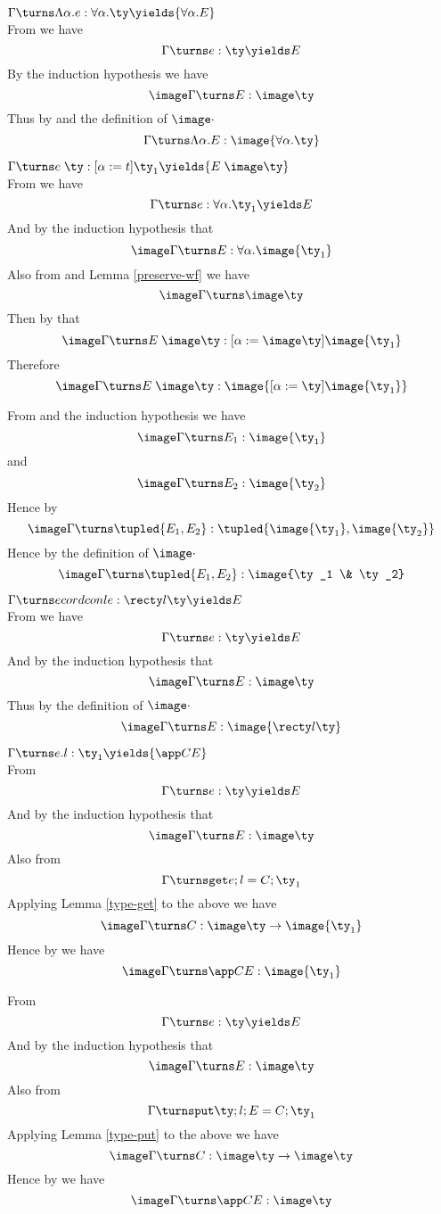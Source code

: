  $ \Gamma \turns \Lambda \alpha. e : \forall \alpha. \ty \yields {\forall \alpha. E} $ \\

From  we have
  $$ \Gamma \turns e : \ty \yields E $$
By the induction hypothesis we have
  $$ \image \Gamma \turns E : \image \ty $$
Thus by  and the definition of $ \image \cdot $
  $$ \Gamma \turns \Lambda \alpha. E : \image {\forall \alpha. \ty} $$


 $ \Gamma \turns e \; \ty  : [\alpha := t] \ty_1 \yields {E \; \image \ty} $ \\

From  we have
  $$ \Gamma \turns e : \forall \alpha. \ty_1 \yields E $$
And by the induction hypothesis that
  $$ \image \Gamma \turns E : \forall \alpha. \image {\ty_1} $$
Also from  and Lemma \ref{preserve-wf} we have
  $$ \image \Gamma \turns \image \ty $$
Then by  that
  $$ \image \Gamma \turns E \; \image \ty : [\alpha := \image \ty ] \image {\ty_1} $$
Therefore
  $$ \image \Gamma \turns E \; \image \ty : \image {[\alpha := \ty ] \image {\ty_1}} $$


From  and the induction hypothesis we have
  $$ \image \Gamma \turns E_1 : \image {\ty_1} $$
and
  $$ \image \Gamma \turns E_2 : \image {\ty_2} $$
Hence by 
  $$ \image \Gamma \turns \tupled {E_1, E_2} : \tupled {\image {\ty_1}, \image {\ty_2}} $$
Hence by the definition of $ \image \cdot $
  $$ \image \Gamma \turns \tupled {E_1, E_2} : \image {\ty_1 \& \ty_2} $$

 $ \Gamma \turns 
ecordcon l e : \recty l \ty \yields E $ \\

From  we have
  $$ \Gamma \turns e : \ty \yields E $$
And by the induction hypothesis that
  $$ \image \Gamma \turns E : \image \ty $$
Thus by the definition of $ \image \cdot $
  $$ \image \Gamma \turns E : \image {\recty l \ty} $$

 $ \Gamma \turns e.l : \ty_1 \yields {\app C E} $ \\

From 
  $$ \Gamma \turns e : \ty \yields E $$
And by the induction hypothesis that
  $$ \image \Gamma \turns E : \image \ty $$
Also from 
  $$ \Gamma \turnsget e ; l = C ; \ty_1 $$
Applying Lemma \ref{type-get} to the above we have
  $$ \image \Gamma \turns C : \image \ty \to \image {\ty_1}  $$
Hence by  we have
  $$ \image \Gamma \turns \app C E : \image {\ty_1} $$

From 
  $$ \Gamma \turns e : \ty \yields E $$
And by the induction hypothesis that
  $$ \image \Gamma \turns E : \image \ty $$
Also from 
  $$ \Gamma \turnsput \ty ; l; E = C ; \ty_1 $$
Applying Lemma \ref{type-put} to the above we have
  $$ \image \Gamma \turns C : \image \ty \to \image \ty  $$
Hence by  we have
  $$ \image \Gamma \turns \app C E : \image \ty $$
